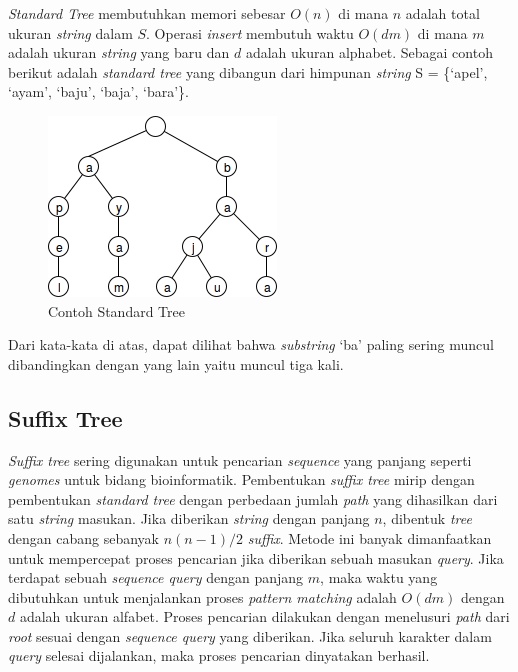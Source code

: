 \textit{Standard Tree} membutuhkan memori sebesar $O(n)$ di mana $n$ adalah total ukuran \textit{string} dalam $S$. Operasi \textit{insert} membutuh waktu $O(dm)$ di mana $m$ adalah ukuran \textit{string} yang baru dan $d$ adalah ukuran alphabet. Sebagai contoh berikut adalah \textit{standard tree} yang dibangun dari himpunan \textit{string} S = \{`apel', `ayam', `baju', `baja', `bara'\}.
\begin{figure}
    \centering
    \includegraphics[scale=0.6]{pics/Contoh-StandardTrie}
    \caption{Contoh Standard Tree}
    \label{fig:contoh-standard-tree}
\end{figure}

\noindent Dari kata-kata di atas, dapat dilihat bahwa \textit{substring} `ba' paling sering muncul dibandingkan dengan yang lain yaitu muncul tiga kali.

\subsection{Suffix Tree} \label{sec:suffix-tree}
\textit{Suffix tree} sering digunakan untuk pencarian \textit{sequence} yang panjang seperti \textit{genomes} untuk bidang bioinformatik. Pembentukan \textit{suffix tree} \citep{ukkonen1995line} mirip dengan pembentukan \textit{standard tree} dengan perbedaan jumlah \textit{path} yang dihasilkan dari satu \textit{string} masukan. Jika diberikan \textit{string} dengan panjang $n$, dibentuk \textit{tree} dengan cabang sebanyak $n(n-1)/2$ \textit{suffix}.  Metode ini banyak dimanfaatkan untuk mempercepat proses pencarian jika diberikan sebuah masukan \textit{query}. Jika terdapat sebuah \textit{sequence query} dengan panjang $m$, maka waktu yang dibutuhkan untuk menjalankan proses \textit{pattern matching} adalah $O(dm)$ dengan $d$ adalah ukuran alfabet. Proses pencarian dilakukan dengan menelusuri \textit{path} dari \textit{root} sesuai dengan \textit{sequence query} yang diberikan. Jika seluruh karakter dalam \textit{query} selesai dijalankan, maka proses pencarian dinyatakan berhasil. 

